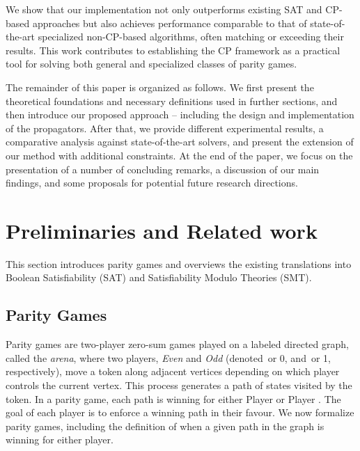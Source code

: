 \documentclass[runningheads]{llncs}
\begin{document}
We show that our implementation not only outperforms existing SAT and CP-based approaches but also achieves performance comparable to that of state-of-the-art specialized non-CP-based algorithms, often matching or exceeding their results. This work contributes to establishing the CP framework as a practical tool for solving both general and specialized classes of parity games.

The remainder of this paper is organized as follows. We first present the theoretical foundations and necessary definitions used in further sections, and then introduce our proposed approach -- including the design and implementation of the \noc propagators. After that, we provide different experimental results, a comparative analysis against state-of-the-art solvers, and present the extension of our method with additional constraints. At the end of the paper, we focus on the presentation of a number of concluding remarks, a discussion of our main findings, and some proposals for potential future research directions.

\section{Preliminaries and Related work}

This section introduces parity games and overviews the existing translations into Boolean Satisfiability (SAT) and Satisfiability Modulo Theories (SMT).

\subsection{Parity Games}

Parity games are two-player zero-sum games played on a labeled directed graph, called the \textit{arena}, where two players, \textit{Even} and \textit{Odd} (denoted~\even or 0, and~\odd or 1, respectively), move a token along adjacent vertices depending on which player controls the current vertex. This process generates a path of states visited by the token. In a parity game, each path is winning for either Player \even or Player \odd. The goal of each player is to enforce a winning path in their favour. We now formalize parity games, including the definition of when a given path in the graph is winning for either player.
\end{document}
